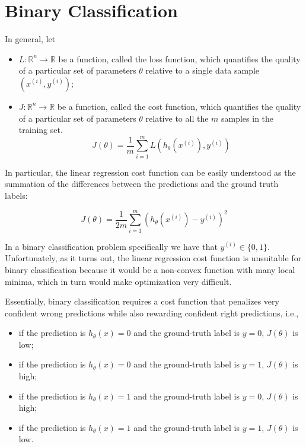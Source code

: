 \section{Binary Classification}

In general, let

\begin{itemize}
    \item $L \colon \mathbb{R}^n \to \mathbb{R}$ be a function, called the loss function, which quantifies the quality of a particular set of parameters $\theta$ relative to a single data sample $(x^{(i)}, y^{(i)})$;
    \item $J \colon \mathbb{R}^n \to \mathbb{R}$ be a function, called the cost function, which quantifies the quality of a particular set of parameters $\theta$ relative to all the $m$ samples in the training set. $$J(\theta) = \frac{1}{m} \sum_{i=1}^{m} L(h_{\theta}(x^{(i)}), y^{(i)})$$
\end{itemize}

In particular, the linear regression cost function can be easily understood as the summation of the differences between the predictions and the ground truth labels:

$$
J(\theta) = \frac{1}{2m} \sum_{i=1}^{m} (h_{\theta}(x^{(i)}) - y^{(i)})^2
$$

In a binary classification problem specifically we have that $y^{(i)} \in \{0, 1\}$. Unfortunately, as it turns out, the linear regression cost function is unsuitable for binary classification because it would be a non-convex function with many local minima, which in turn would make optimization very difficult.

Essentially, binary classification requires a cost function that penalizes very confident wrong predictions while also rewarding confident right predictions, i.e.,

\begin{itemize}
    \item if the prediction is $h_{\theta}(x) = 0$ and the ground-truth label is $y = 0$, $J(\theta)$ is low;
    \item if the prediction is $h_{\theta}(x) = 0$ and the ground-truth label is $y = 1$, $J(\theta)$ is high;
    \item if the prediction is $h_{\theta}(x) = 1$ and the ground-truth label is $y = 0$, $J(\theta)$ is high;
    \item if the prediction is $h_{\theta}(x) = 1$ and the ground-truth label is $y = 1$, $J(\theta)$ is low.
\end{itemize}

